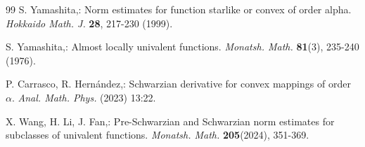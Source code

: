 \documentclass[a4paper,12pt]{amsart}
\theoremstyle{plain}
\theoremstyle{definition}
\theoremstyle{plain}
\begin{document}
\begin{thebibliography}{99}
  {\sc S. Yamashita},: Norm estimates for function starlike or convex of order alpha. \textit{Hokkaido Math. J.} \textbf{28}, 217-230 (1999).

  {\sc S. Yamashita},: Almost locally univalent functions. \textit{Monatsh. Math.} \textbf{81}(3), 235-240 (1976).


  {\sc P. Carrasco}, {\sc R. Hernández},: Schwarzian derivative for convex mappings of order $\alpha$. \textit{Anal. Math. Phys.} (2023) 13:22.


  {\sc X. Wang}, {\sc H. Li}, {\sc J. Fan},: Pre-Schwarzian and Schwarzian norm estimates for
subclasses of univalent functions. \textit{Monatsh. Math.} \textbf{205}(2024), 351-369.
\end{thebibliography}
\end{document}
